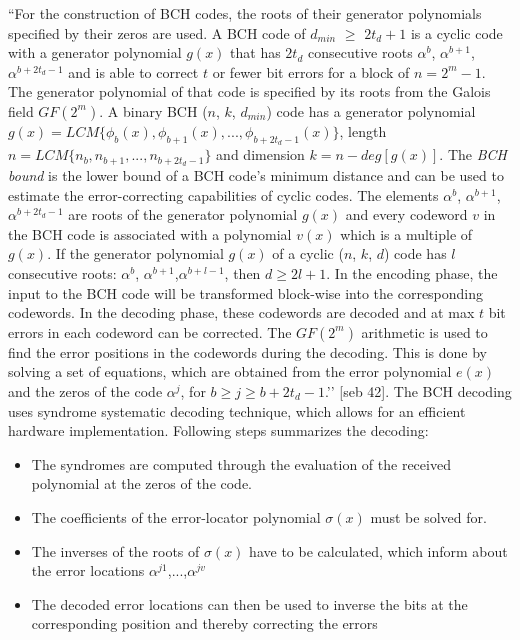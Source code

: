 ``For the construction of BCH codes, the roots of their generator polynomials specified by their zeros are used. A BCH code of $d_{min}$ $\geq$ $2t_d + 1$ is a cyclic code with a generator polynomial $g(x)$ that has $2t_d$ consecutive roots $\alpha^b$, $\alpha^{b+1}$,$\alpha^{b+2t_d-1}$ and is able to correct $t$ or fewer bit errors for a block of $n = 2^m - 1$. The generator polynomial of that code is specified by its roots from the Galois field $GF(2^m)$. A binary BCH ($n$, $k$, $d_{min}$) code
has a generator polynomial $g(x) = LCM\{\phi_{b}(x), \phi_{b+1}(x),...,\phi_{b+2t_{d}-1}(x)\}$, length $n = LCM\{n_b,n_{b+1},...,n_{b+2t_d-1}\}$ and dimension $k = n - deg[g(x)]$. The \emph{BCH bound} is the lower bound of a BCH code’s minimum distance and can be used to estimate the error-correcting capabilities of cyclic codes. The elements $\alpha^b$, $\alpha^{b+1}$,$\alpha^{b+2t_d-1}$ are roots of the generator polynomial $g(x)$ and every codeword $v$ in the BCH code is associated with a
polynomial $v(x)$ which is a multiple of $g(x)$. If the generator polynomial $g(x)$ of a cyclic ($n$, $k$, $d$) code has $l$ consecutive roots: $\alpha^b$, $\alpha^{b+1}$,$\alpha^{b+l-1}$, then $d \geq 2l +1$. In the encoding phase, the input to the BCH code will be transformed block-wise into the corresponding codewords. In the decoding phase, these codewords are decoded and at max $t$ bit errors in each codeword can be corrected. The $GF(2^m)$ arithmetic is used to find the error positions
in the codewords during the decoding. This is done by solving a set of equations, which are obtained from the error polynomial $e(x)$ and the zeros of the code $\alpha^j$, for $b \geq j \geq b + 2t_d - 1$.’’ [seb 42]. The BCH decoding uses syndrome systematic decoding technique, which allows for an efficient hardware implementation. Following steps summarizes the decoding:

\begin{itemize}\itemsep-\the\parsep %
\item The syndromes are computed through the evaluation of the received polynomial at the zeros of the code.
\item The coefficients of the error-locator polynomial $\sigma(x)$ must be solved for.
\item The inverses of the roots of $\sigma(x)$ have to be calculated, which inform about the error locations $\alpha^{j1}$,...,$\alpha^{jv}$
\item The decoded error locations can then be used to inverse the bits at the corresponding position and thereby correcting the errors
\end{itemize}


